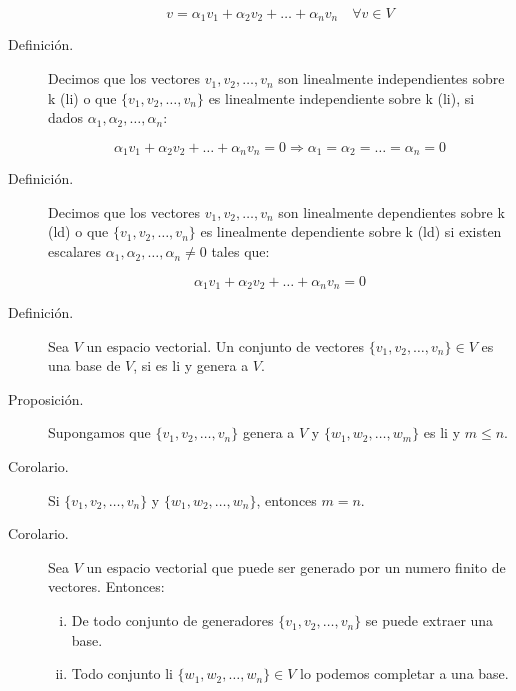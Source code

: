 \documentclass[12pt]{article}
\begin{document}
\begin{description}
\begin{equation}
v = \alpha_1 v_1 + \alpha_2 v_2 + \dots + \alpha_n v_n \quad \forall v \in V 
\end{equation}

\item [Definición.] Decimos que los vectores $v_1, v_2, \dots, v_n$ son linealmente independientes sobre k (li) o que $\{ v_1, v_2, \dots, v_n\}$ es linealmente independiente sobre k (li), si dados $\alpha_1, \alpha_2, \dots, \alpha_n$:

\begin{equation}
\alpha_1 v_1 + \alpha_2 v_2 + \dots + \alpha_n v_n = 0 \Rightarrow \alpha_1 = \alpha_2 = \dots = \alpha_n = 0
\end{equation}

\item [Definición.] Decimos que los vectores $v_1, v_2, \dots, v_n$ son linealmente dependientes sobre k (ld) o que $\{ v_1, v_2, \dots, v_n\}$ es linealmente dependiente sobre k (ld) si existen escalares $\alpha_1, \alpha_2, \dots, \alpha_n \ne 0$ tales que:

\begin{equation}
\alpha_1 v_1 + \alpha_2 v_2 + \dots + \alpha_n v_n = 0
\end{equation}

\item [Definición.] Sea $V$ un espacio vectorial. Un conjunto de vectores $\{ v_1, v_2, \dots, v_n \} \in V$ es una base de $V$, si es li y genera a $V$.

\item [Proposición.] Supongamos que $\{ v_1, v_2, \dots, v_n \}$ genera a $V$ y $\{ w_1, w_2, \dots, w_m\}$ es li y $m \le n$.

\item [Corolario.] Si $\{ v_1, v_2, \dots, v_n \}$ y $\{ w_1, w_2, \dots, w_n \}$, entonces $m = n$.

\item [Corolario.] Sea $V$ un espacio vectorial que puede ser generado por un numero finito de vectores. Entonces:

\begin{enumerate}[i)]
\item De todo conjunto de generadores $\{ v_1, v_2, \dots, v_n \}$ se puede extraer una base.
\item Todo conjunto li $\{ w_1, w_2, \dots, w_n \} \in V$ lo podemos completar a una base.
\end{enumerate}


\end{description}
\end{document}
